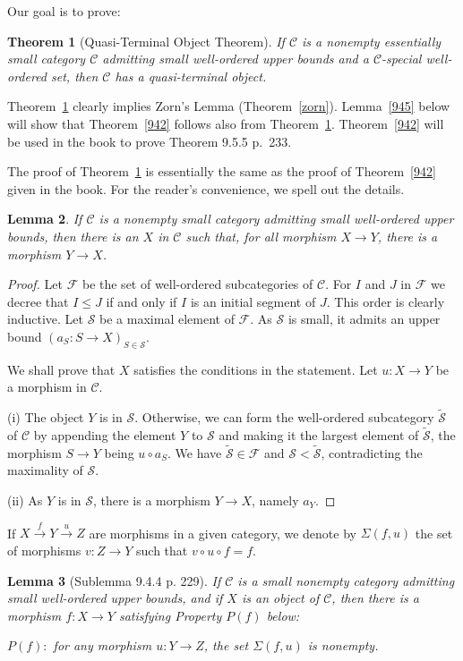 \documentclass[12pt]{article}%
\newtheorem{thm}{Theorem}%
\newtheorem{lem}[thm]{Lemma}
\theoremstyle{remark}
\theoremstyle{definition}
\newcommand{\nn}{\noindent}
\newcommand{\cc}{\mathcal}
\newcommand{\C}{\mathcal C}
\newcommand{\xr}{\xrightarrow}
\begin{document}
Our goal is to prove:

\begin{thm}[Quasi-Terminal Object Theorem]\label{qtot}
If $\C$ is a nonempty essentially small category $\C$ admitting small well-ordered upper bounds and a $\C$-special well-ordered set, then $\C$ has a quasi-terminal object.
\end{thm}

Theorem~\ref{qtot} clearly implies Zorn's Lemma (Theorem~\ref{zorn}). Lemma~\ref{945} below will show that Theorem~\ref{942} follows also from Theorem~\ref{qtot}. Theorem~\ref{942} will be used in the book to prove Theorem 9.5.5 p.~233.

The proof of Theorem~\ref{qtot} is essentially the same as the proof of Theorem~\ref{942} given in the book. For the reader's convenience, we spell out the details. 

\begin{lem}\label{943}
If $\C$ is a nonempty small category admitting small well-ordered upper bounds, then there is an $X$ in $\C$ such that, for all morphism $X\to Y$, there is a morphism $Y\to X$.
\end{lem}

\begin{proof}
Let $\cc F$ be the set of well-ordered subcategories of $\C$. For $I$ and $J$ in $\cc F$ we decree that $I\le J$ if and only if $I$ is an initial segment of $J$. This order is clearly inductive. Let $\cc S$ be a maximal element of $\cc F$. As $\cc S$ is small, it admits an upper bound $(a_S:S\to X)_{S\in\cc S}$. 

We shall prove that $X$ satisfies the conditions in the statement. Let $u:X\to Y$ be a morphism in $\C$. 

\nn(i) The object $Y$ is in $\cc S$. Otherwise, we can form the well-ordered subcategory $\widetilde{\cc S}$ of $\C$ by appending the element $Y$ to $\cc S$ and making it the largest element of $\widetilde{\cc S}$, the morphism $S\to Y$ being $u\circ a_S$. We have $\widetilde{\cc S}\in\cc F$ and $\cc S<\widetilde{\cc S}$, contradicting the maximality of $\cc S$. 

\nn(ii) As $Y$ is in $\cc S$, there is a morphism $Y\to X$, namely $a_Y$.
\end{proof}

If $X\xr fY\xr uZ$ are morphisms in a given category, we denote by $\Sigma(f,u)$ the set of morphisms $v:Z\to Y$ such that $v\circ u\circ f=f$. 

\begin{lem}[Sublemma 9.4.4 p. 229]\label{944}
If $\C$ is a small nonempty category admitting small well-ordered upper bounds, and if $X$ is an object of $\C$, then there is a morphism $f:X\to Y$ satisfying Property $P(f)$ below: 

\nn$P(f):$ for any morphism $u:Y\to Z$, the set $\Sigma(f,u)$ is nonempty.
\end{lem}
\end{document}
